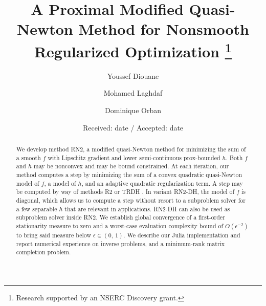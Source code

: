 \documentclass[smallextended]{svjour3}       %
\newcommand{\papertitle}{A Proximal Modified Quasi-Newton Method for Nonsmooth Regularized Optimization}
\begin{document}
\title{%
  \papertitle
  \thanks{Research supported by an NSERC Discovery grant.}%
}


\author{%
  Youssef Diouane \and
  Mohamed Laghdaf \and
  Dominique Orban
}



\date{Received: date / Accepted: date}

\linenumbers
\pagestyle{myheadings}

\maketitle
\thispagestyle{mytitlepage}

\begin{abstract}
  We develop method RN2, a modified quasi-Newton method for minimizing the sum of a smooth \(f\) with Lipschitz gradient and lower semi-continuous prox-bounded \(h\).
  Both \(f\) and \(h\) may be nonconvex and may be bound constrained.
  At each iteration, our method computes a step by minimizing the sum of a convex quadratic quasi-Newton model of \(f\), a model of \(h\), and an adaptive quadratic regularization term. 
  A step may be computed by way of methods R2 \citep{aravkin-baraldi-orban-2022} or TRDH \citep{leconte-orban-2023}.
  In variant RN2-DH, the model of \(f\) is diagonal, which allows us to compute a step without resort to a subproblem solver for a few separable \(h\) that are relevant in applications.
  RN2-DH can also be used as subproblem solver inside RN2.
  We establish global convergence of a first-order stationarity measure to zero and a worst-case evaluation complexity bound of \(O(\epsilon^{-2})\) to bring said measure below \(\epsilon \in (0, \, 1)\).
  We describe our Julia implementation and report numerical experience on inverse problems, and a minimum-rank matrix completion problem.
\end{abstract}
\end{document}
